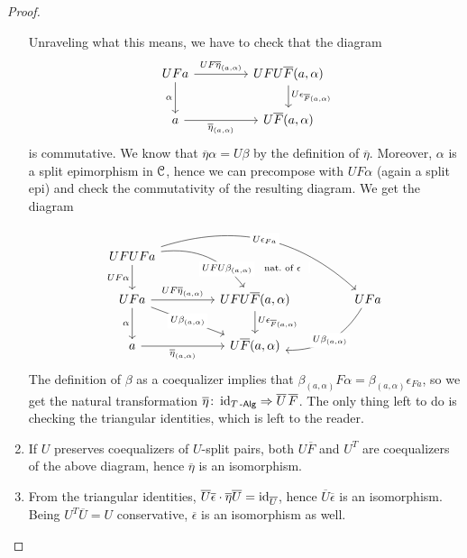 \documentclass[a4paper,11pt,oneside,openany]{scrbook}
\begin{document}
\begin{proof}
\begin{enumerate}
		      Unraveling what this means, we have to check that the diagram
		      \[
			      \begin{tikzcd}[column sep=1.5cm]
				      UFa\ar[r, "UF\overline{\eta}_{(a,\alpha)}"]\ar[d,"\alpha"']
				      & UFU\overline{F}(a,\alpha)\ar[d, "U\epsilon_{\overline{F}(a,\alpha)}"] \\
				      a\ar[r, "\overline{\eta}_{(a,\alpha)}"']
				      & U\overline{F}(a,\alpha)
			      \end{tikzcd}
		      \]
		      is commutative. We know that $\overline{\eta}\alpha=U\beta$ by the definition of $\overline{\eta}$. Moreover, $\alpha$ is a split epimorphism in $\operatorname{\mathcal{C}}$, hence we can precompose with $UF\alpha$ (again a split epi) and check the commutativity of the resulting diagram. We get the diagram
		      \[
			      \begin{tikzcd}[column sep=1.5cm]
				      UFUFa\arrow[d, "UF\alpha"'] \arrow[rd, bend left, near end, "UFU\beta_{(a,\alpha)}"description] \arrow[rrd, bend left, "U\epsilon_{Fa}"description] &            & \ar[lld,draw=none, near start,"\hspace{-1.5cm}\text{nat.\ of\ } \epsilon" description]  \\
				      UFa\arrow[d, "\alpha"'] \arrow[r, "UF\overline{\eta}_{(a,\alpha)}"] \arrow[rd, "U\beta_{(a,\alpha)}"description]                        & UFU\overline{F}(a,\alpha)  \arrow[d, "U\epsilon_{\overline{F}(a,\alpha)}"] &        UFa           \arrow[ld, bend left, "U\beta_{(a,\alpha)}"description]      \\
				      a\arrow[r, "\overline{\eta}_{(a,\alpha)}"']                                             &     U\overline{F}(a,\alpha)       &
			      \end{tikzcd}
		      \]
		      The definition of $\beta$ as a coequalizer implies that $\beta_{(a,\alpha)}F\alpha=\beta_{(a,\alpha)}\epsilon_{Fa}$, so we get the natural transformation $\overline{\eta}\colon\operatorname{id}_{T\operatorname{-\mathsf{Alg}}}\Rightarrow\overline{U}\hspace{.5mm}\overline{F}$. The only thing left to do is checking the triangular identities, which is left to the reader.

		\item If $U$ preserves coequalizers of $U$-split pairs, both $U\overline{F}$ and $U^T$ are coequalizers of the above diagram, hence $\overline{\eta}$ is an isomorphism.

		\item From the triangular identities, $\overline{U}\overline{\epsilon}\cdot\overline{\eta}\overline{U}=\operatorname{id}_{\overline{U}}$, hence $\overline{U}\overline{\epsilon}$ is an isomorphism. Being $U^T\overline{U}=U$ conservative, $\overline{\epsilon}$ is an isomorphism as well. \qedhere
	\end{enumerate}
\end{proof}
\end{document}
